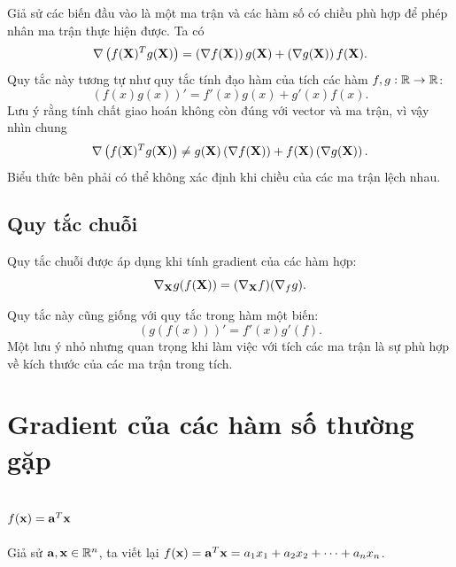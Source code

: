 Giả sử các biến đầu vào là một ma trận và các hàm số có chiều phù hợp để phép
nhân ma trận thực hiện được. Ta có
\begin{equation}
\label{eqn:productrules}
\nabla\left( f(\mathbf{X})^Tg(\mathbf{X}) \right) = \left(\nabla f(\mathbf{X})\right) g(\mathbf{X}) +
\left(\nabla g(\mathbf{X})\right) f(\mathbf{X}).
\end{equation}
Quy tắc này tương tự như quy tắc tính đạo hàm của tích các hàm $f, g: \mathbb{R} \rightarrow \mathbb{R}$:
\begin{equation*}
\left(f(x)g(x)\right)' = f'(x)g(x) + g'(x)f(x).
\end{equation*}
Lưu ý rằng tính chất giao hoán không còn đúng với vector và ma trận, vì vậy nhìn chung
\begin{equation}
\nabla\left( f(\mathbf{X})^Tg(\mathbf{X}) \right) \neq  g(\mathbf{X})\left(\nabla f(\mathbf{X})\right) +
f(\mathbf{X})\left(\nabla g(\mathbf{X})\right).
\end{equation}
Biểu thức bên phải có thể không xác định khi chiều của các ma trận lệch nhau.

\subsection{Quy tắc chuỗi}

Quy tắc chuỗi được áp dụng khi tính gradient của các hàm hợp:
\begin{equation}
\label{eqn:chainrules}
\nabla_{\mathbf{X}} g(f(\mathbf{X})) = (\nabla_{\mathbf{X}} f) (\nabla_{f}g).
\end{equation}

Quy tắc này cũng giống với quy tắc trong hàm một biến:
\begin{equation*}
(g(f(x)))' = f'(x)g'(f).
\end{equation*}
Một lưu ý nhỏ nhưng quan trọng khi làm việc với tích các ma trận là sự phù hợp
về kích thước của các ma trận trong tích.
\section{Gradient của các hàm số thường gặp }

\subsection{$f(\mathbf{x}) = \mathbf{a}^T\mathbf{x}$}

Giả sử $\mathbf{a}, \mathbf{x} \in \mathbb{R}^n$, ta viết lại $f(\mathbf{x}) =
\mathbf{a}^T\mathbf{x} = a_1 x_1 + a_2 x_2 + \dots + a_nx_n$.


